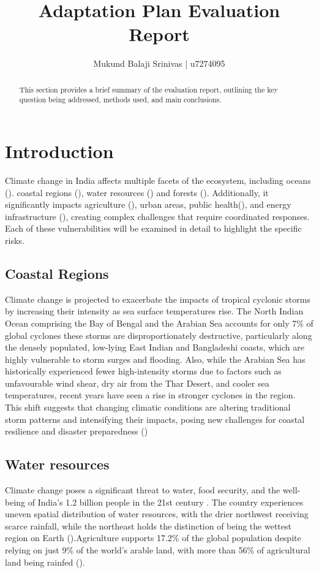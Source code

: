 \documentclass[12pt]{article}
\title{Adaptation Plan Evaluation Report}
\author{Mukund Balaji Srinivas | u7274095}
\date{} %
\begin{document}
\maketitle

\begin{abstract}
This section provides a brief summary of the evaluation report, outlining the key question being addressed, methods used, 
and main conclusions.
\end{abstract}

\newpage

\section*{Introduction}
Climate change in India affects multiple facets of the ecosystem, including oceans (\cite{marathe_2021}).
coastal regions (\cite{gupta_2019}), water resources (\cite{shiva_shankar_2021}) and forests (\cite{Lele2019ClimateCA}). Additionally, it significantly impacts 
agriculture (\cite{Kumar2023DeterminantsOC}), urban areas, public health(\cite{rajput_2022}), and energy infrastructure (\cite{Yarlagadda_22}), 
creating complex challenges that require coordinated responses. Each of these vulnerabilities will be examined in detail to highlight the specific risks.
\subsection*{Coastal Regions}
Climate change is projected to exacerbate the impacts of tropical cyclonic storms by increasing their intensity as sea surface temperatures 
rise. The North Indian Ocean comprising the Bay of Bengal and the Arabian Sea accounts for only 7\% of global cyclones 
these storms are disproportionately destructive, particularly along the densely populated, low-lying East Indian and Bangladeshi coasts, 
which are highly vulnerable to storm surges and flooding. Also, while the Arabian Sea has historically experienced fewer high-intensity storms due to 
factors such as unfavourable wind shear, dry air from the Thar Desert, and cooler sea temperatures, recent years have seen a rise in stronger cyclones 
in the region. This shift suggests that changing climatic conditions are altering traditional storm patterns and intensifying their impacts, posing 
new challenges for coastal resilience and disaster preparedness (\cite{gupta_2019})

\subsection*{Water resources}
Climate change poses a significant threat to water, food security, and the well-being of India’s 
1.2 billion people in the 21st century . The country experiences uneven spatial distribution of water resources, 
with the drier northwest receiving scarce rainfall, while the northeast holds the distinction of being the 
wettest region on Earth (\cite{goyal_2018}).Agriculture supports 17.2\% of the global population 
despite relying on just 9\% of the world’s arable land, with more than 56\% of agricultural land being rainfed (\cite{mishra_2016}). 
\end{document}
